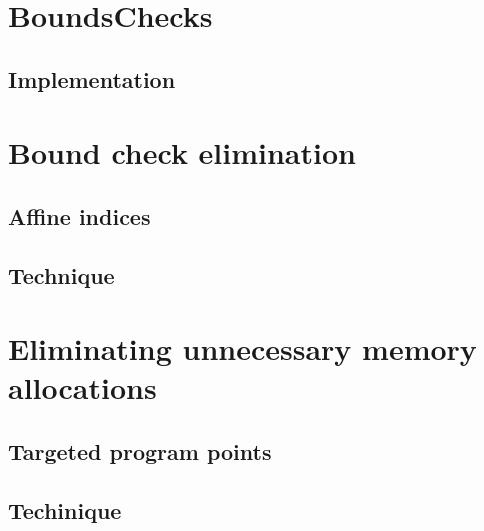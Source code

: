 \section{BoundsChecks}
\subsection{Implementation}
\section{Bound check elimination}
\subsection{Affine indices}
\subsection{Technique}
\section{Eliminating unnecessary memory allocations}
\label{sec:memoptimise}
\subsection{Targeted program points}
\subsection{Techinique}




